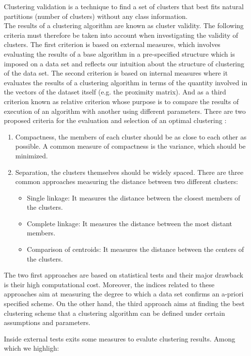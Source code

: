 Clustering validation is a technique to find a set of clusters that best fits natural partitions (number of clusters) without any class information.
\\
The results of a clustering algorithm are known as cluster validity. The following criteria must therefore be taken into account when investigating the validity of clusters. The first criterion is based on external measures, which involves evaluating the results of a base algorithm in a pre-specified structure which is imposed on a data set and reflects our intuition about the structure of clustering of the data set. The second criterion is based on internal measures where it evaluates the results of a clustering algorithm in terms of the quantity involved in the vectors of the dataset itself (e.g. the proximity matrix). And as a third criterion known as relative criterion whose purpose is to compare the results of execution of an algorithm with another using different parameters.
There are two proposed criteria for the evaluation and selection of an optimal clustering \cite{b53} \cite{b52}:
\begin{enumerate}
  \item Compactness, the members of each cluster should be as close to each other as possible. A common measure of compactness is the variance, which should be minimized.
  \item Separation, the clusters themselves should be widely spaced. There are three common approaches measuring the distance between two different clusters:
  \begin{itemize}
  \item Single linkage: It measures the distance between the closest members of the clusters.
  \item Complete linkage: It measures the distance between the most distant members.
  \item Comparison of centroids: It measures the distance between the centers of the clusters.
\end{itemize}
\end{enumerate}
The two first approaches are based on statistical tests and their major drawback is their high computational cost. Moreover, the indices related to these approaches aim at measuring the degree to which a data set confirms an a-priori specified scheme. On the other hand, the third approach aims at finding the best clustering scheme that a clustering algorithm can be defined under certain assumptions and parameters.

Inside external tests exits some measures to evalute clustering results. Among which we highligh:


